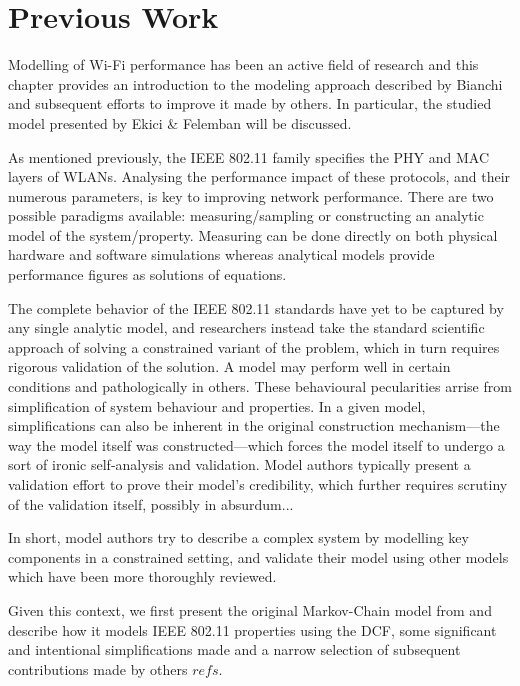 
\chapter{Previous Work}

Modelling of Wi-Fi performance has been an active field of research and this
chapter provides an introduction to the modeling approach described by Bianchi
\cite{bianchi} and subsequent efforts to improve it made by others. In
particular, the studied model presented by Ekici \& Felemban \cite{felemban}
will be discussed.

As mentioned previously, the IEEE 802.11 family specifies the PHY and MAC
layers of WLANs. Analysing the performance impact of these protocols, and
their numerous parameters, is key to improving network performance. There are
two possible paradigms available: measuring/sampling or constructing an
analytic model of the system/property. Measuring can be done directly on both
physical hardware and software simulations whereas analytical models provide
performance figures as solutions of equations.

The complete behavior of the IEEE 802.11 standards have yet to be captured by
any single analytic model, and researchers instead take the standard
scientific approach of solving a constrained variant of the problem, which in
turn requires rigorous validation of the solution. A model may perform well in
certain conditions and pathologically in others. These behavioural
pecularities arrise from simplification of system behaviour and properties. In
a given model, simplifications can also be inherent in the original
construction mechanism—the way the model itself was constructed—which forces
the model itself to undergo a sort of ironic self-analysis and validation.
Model authors typically present a validation effort to prove their model's
credibility, which further requires scrutiny of the validation itself,
possibly in absurdum...

In short, model authors try to describe a complex system by modelling key
components in a constrained setting, and validate their model using other
models which have been more thoroughly reviewed.

Given this context, we first present the original Markov-Chain model from
\cite{bianchi} and describe how it models IEEE 802.11 properties using the
DCF, some significant and intentional simplifications made and a narrow
selection of subsequent contributions made by others $refs$. %


